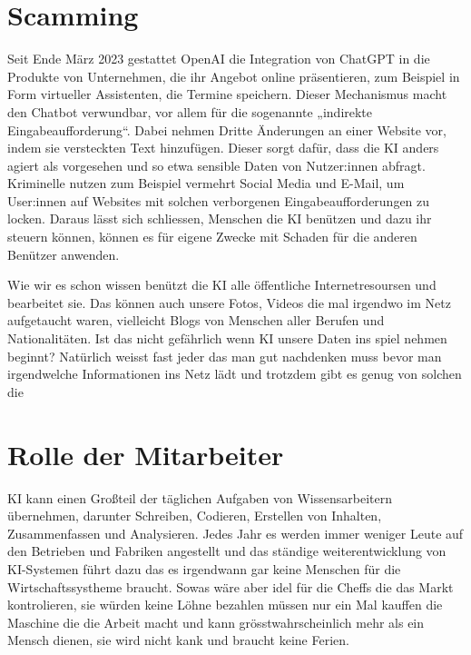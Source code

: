 \documentclass{report}
\begin{document}
 

 \section{Scamming}
 Seit Ende März 2023 gestattet OpenAI die Integration von ChatGPT in die Produkte von Unternehmen, 
 die ihr Angebot online präsentieren, zum Beispiel in Form virtueller Assistenten, die Termine speichern. 
 Dieser Mechanismus macht den Chatbot verwundbar, vor allem für die sogenannte „indirekte Eingabeaufforderung“.
 Dabei nehmen Dritte Änderungen an einer Website vor, indem sie versteckten Text hinzufügen. Dieser sorgt dafür,
 dass die KI anders agiert als vorgesehen und so etwa sensible Daten von Nutzer:innen abfragt. Kriminelle nutzen 
 zum Beispiel vermehrt Social Media und E-Mail, um User:innen auf Websites mit solchen verborgenen Eingabeaufforderungen zu locken.
 Daraus lässt sich schliessen, Menschen die KI benützen und dazu ihr steuern können, können es für eigene Zwecke mit Schaden 
 für die anderen Benützer anwenden. 
 
 Wie wir es schon wissen benützt die KI alle öffentliche Internetresoursen und bearbeitet sie. Das können auch unsere Fotos, Videos 
 die mal irgendwo im Netz aufgetaucht waren, vielleicht  Blogs von Menschen aller Berufen und Nationalitäten. 
 Ist das nicht gefährlich wenn KI unsere Daten ins spiel nehmen beginnt? Natürlich weisst fast jeder das man gut nachdenken 
 muss bevor man irgendwelche Informationen ins Netz lädt und trotzdem gibt es genug von solchen die 
 
 
 \section{Rolle der Mitarbeiter}
 KI kann einen Großteil der täglichen Aufgaben von Wissensarbeitern übernehmen, darunter Schreiben,
 Codieren, Erstellen von Inhalten, Zusammenfassen und Analysieren.  Jedes Jahr es werden immer weniger Leute auf den
 Betrieben und Fabriken angestellt und das ständige weiterentwicklung von KI-Systemen führt dazu das es irgendwann gar keine Menschen
 für die Wirtschaftssystheme braucht. Sowas wäre aber idel für die Cheffs die das Markt kontrolieren, sie würden keine Löhne bezahlen müssen 
 nur ein Mal kauffen die Maschine die die Arbeit macht und kann grösstwahrscheinlich mehr als ein Mensch dienen, sie wird nicht kank und braucht keine 
 Ferien. 
 
\end{document}

